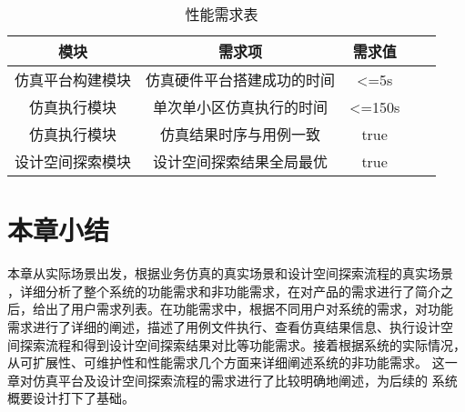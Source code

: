 \begin{table}[htb]
    \centering\normalsize
    \caption{性能需求表}
    \begin{tabular}{|c|c|c|ll}
    \hline
    模块       & 需求项           & 需求值               \\ \hline
    仿真平台构建模块 & 仿真硬件平台搭建成功的时间 & \textless{}=5s    \\ \hline
    仿真执行模块   & 单次单小区仿真执行的时间  & \textless{}=150s   \\ \hline
    仿真执行模块   & 仿真结果时序与用例一致   & true              \\ \hline
    设计空间探索模块 & 设计空间探索结果全局最优  & true              \\ \hline
    \end{tabular}
    \end{table}

\section{本章小结}
本章从实际场景出发，根据业务仿真的真实场景和设计空间探索流程的真实场景
，详细分析了整个系统的功能需求和非功能需求，在对产品的需求进行了简介之
后，给出了用户需求列表。在功能需求中，根据不同用户对系统的需求，对功能
需求进行了详细的阐述，描述了用例文件执行、查看仿真结果信息、执行设计空
间探索流程和得到设计空间探索结果对比等功能需求。接着根据系统的实际情况，
从可扩展性、可维护性和性能需求几个方面来详细阐述系统的非功能需求。
这一章对仿真平台及设计空间探索流程的需求进行了比较明确地阐述，为后续的
系统概要设计打下了基础。